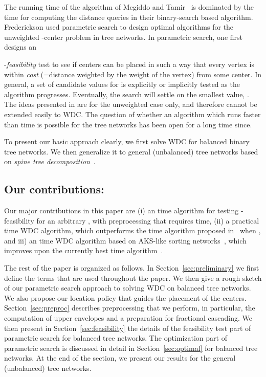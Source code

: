 \documentclass{llncs}
\begin{document}
The running time of the algorithm of Megiddo and Tamir~\cite{megiddo1983c}
is dominated by the time for computing the distance queries in their binary-search based algorithm.
Frederickson \cite{frederickson1990,frederickson1991b} used parametric search
to design optimal algorithms for the unweighted -center problem in tree networks.
In parametric search,
one first designs an {-{\em feasibility} test to see if  centers can be placed
in such a way that every vertex is within {\em cost} (=distance weighted by the weight of the vertex)
 from some center.
In general, a set of candidate values for  is explicitly or implicitly tested
as the algorithm progresses.
Eventually, the search will settle on the smallest  value, .
The ideas presented in \cite{frederickson1990,frederickson1991b} are for the unweighted case only,
and therefore cannot be extended easily to WDC.
The question of whether an algorithm which runs faster than  time
is possible for the tree networks has been open for a long time since.

To present our basic approach clearly,
we first solve WDC for balanced binary tree networks.
We then generalize it to general (unbalanced) tree networks based on {\em spine tree decomposition}~\cite{benkoczi2004,benkoczi2003}.


\subsection{Our contributions:}
Our major contributions in this paper are
(i) an  time algorithm for testing -feasibility for an arbitrary ,
with preprocessing that requires  time,
(ii) a practical  time WDC algorithm,
which outperforms the  time algorithm proposed in~\cite{megiddo1983c}
when ,
and
iii)  an  time WDC algorithm based on AKS-like sorting
networks~\cite{ajtai1983,goodrich2014,seiferas2009},
which improves upon the currently best  time algorithm~\cite{cole1987,megiddo1983c}.

The rest of the paper is organized as follows.
In Section~\ref{sec:preliminary} we first define the terms that are used throughout the paper.
We then give a rough sketch of our parametric search approach to solving WDC on balanced tree networks.
We also propose our location policy that guides the placement of the centers.
Section~\ref{sec:preproc} describes preprocessing that we perform,
in particular, the computation of upper envelopes and
a preparation for fractional cascading.
We then present in Section~\ref{sec:feasibility} the details of the feasibility test
part of parametric search for balanced tree networks.
The optimization part of parametric search is discussed in detail in Section~\ref{sec:optimal}
for balanced tree networks.
At the end of the section,
we present our results for the general (unbalanced) tree networks.

}
\end{document}
